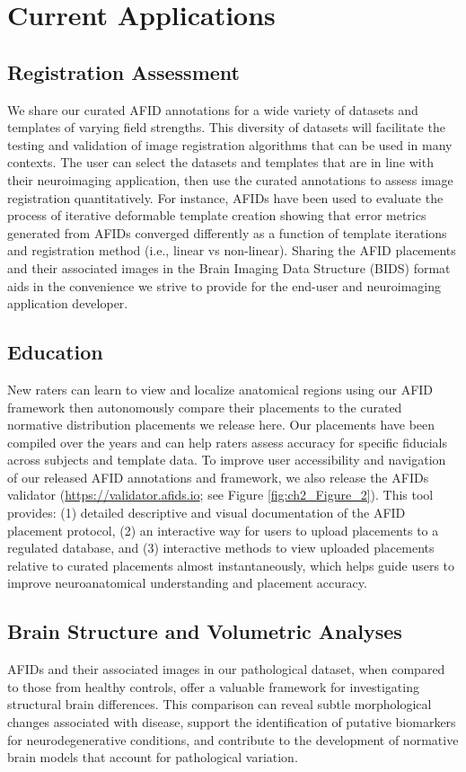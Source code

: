 \section{Current Applications}
\subsection{Registration Assessment}
We share our curated AFID annotations for a wide variety of datasets and templates of varying field strengths. This diversity of datasets will facilitate the testing and validation of image registration algorithms that can be used in many contexts. The user can select the datasets and templates that are in line with their neuroimaging application, then use the curated annotations to assess image registration quantitatively. For instance, AFIDs have been used to evaluate the process of iterative deformable template creation \cite{Xiao2019-ao,Lau2020-dh} showing that error metrics generated from AFIDs converged differently as a function of template iterations and registration method (i.e., linear vs non-linear). Sharing the AFID placements and their associated images in the Brain Imaging Data Structure (BIDS) format aids in the convenience we strive to provide for the end-user and neuroimaging application developer.

\subsection{Education}
New raters can learn to view and localize anatomical regions using our AFID framework then autonomously compare their placements to the curated normative distribution placements we release here. Our placements have been compiled over the years and can help raters assess accuracy for specific fiducials across subjects and template data. To improve user accessibility and navigation of our released AFID annotations and framework, we also release the AFIDs validator (\url{https://validator.afids.io}; see Figure \ref{fig:ch2_Figure_2}). This tool provides: (1) detailed descriptive and visual documentation of the AFID placement protocol, (2) an interactive way for users to upload placements to a regulated database, and (3) interactive methods to view uploaded placements relative to curated placements almost instantaneously, which helps guide users to improve neuroanatomical understanding and placement accuracy.

\subsection{Brain Structure and Volumetric Analyses}
AFIDs and their associated images in our pathological dataset, when compared to those from healthy controls, offer a valuable framework for investigating structural brain differences. This comparison can reveal subtle morphological changes associated with disease, support the identification of putative biomarkers for neurodegenerative conditions, and contribute to the development of normative brain models that account for pathological variation.

